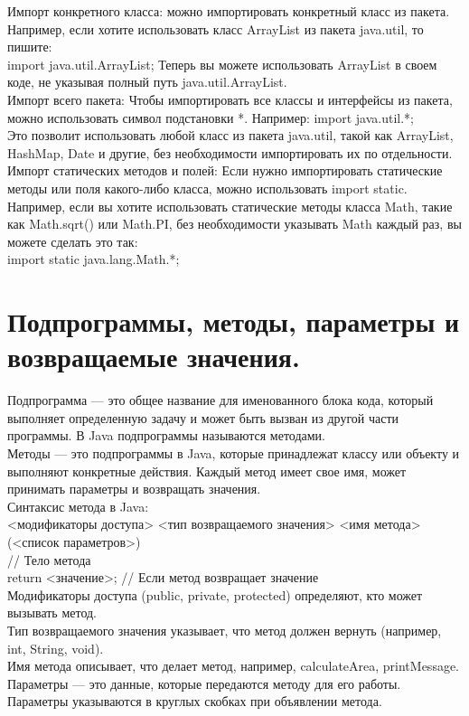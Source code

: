 Импорт конкретного класса: можно импортировать конкретный класс из пакета. Например, если хотите использовать класс ArrayList из пакета java.util, то пишите:  \\
import java.util.ArrayList; Теперь вы можете использовать ArrayList в своем коде, не указывая полный путь java.util.ArrayList. \\
Импорт всего пакета: Чтобы импортировать все классы и интерфейсы из пакета, можно использовать символ подстановки *. Например: import java.util.*; \\
Это позволит использовать любой класс из пакета java.util, такой как ArrayList, HashMap, Date и другие, без необходимости импортировать их по отдельности. \\
Импорт статических методов и полей: Если нужно импортировать статические методы или поля какого-либо класса, можно использовать import static. Например, если вы хотите использовать статические методы класса Math, такие как Math.sqrt() или Math.PI, без необходимости указывать Math каждый раз, вы можете сделать это так: \\
import static java.lang.Math.*;
\section{Подпрограммы, методы, параметры и возвращаемые значения.}
Подпрограмма — это общее название для именованного блока кода, который выполняет определенную задачу и может быть вызван из другой части программы. В Java подпрограммы называются методами. \\
Методы — это подпрограммы в Java, которые принадлежат классу или объекту и выполняют конкретные действия. Каждый метод имеет свое имя, может принимать параметры и возвращать значения. \\
Синтаксис метода в Java: \\
<модификаторы доступа> <тип возвращаемого значения> <имя метода>(<список параметров>) { \\
    // Тело метода \\
    return <значение>;  // Если метод возвращает значение \\
} 
Модификаторы доступа (public, private, protected) определяют, кто может вызывать метод. \\
Тип возвращаемого значения указывает, что метод должен вернуть (например, int, String, void). \\ 
Имя метода описывает, что делает метод, например, calculateArea, printMessage. \\
Параметры — это данные, которые передаются методу для его работы. Параметры указываются в круглых скобках при объявлении метода.
